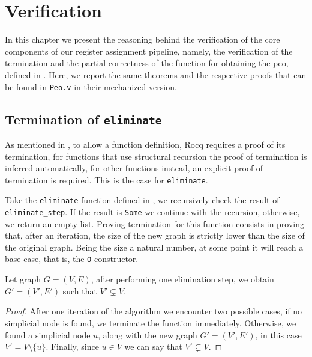 
\chapter{Verification}
\label{cha:verification}

In this chapter we present the reasoning behind the verification of the core components of our register assignment pipeline, namely, the verification of the termination and the partial correctness of the function for obtaining the \gls{peo}, defined in . Here, we report the same theorems and the respective proofs that can be found in \texttt{Peo.v} in their mechanized version.

\section{Termination of \texttt{eliminate}}

As mentioned in , to allow a function definition, Rocq requires a proof of its termination, for functions that use structural recursion the proof of termination is inferred automatically, for other functions instead, an explicit proof of termination is required. This is the case for \texttt{eliminate}.

Take the \texttt{eliminate} function defined in , we recursively check the result of \texttt{eliminate\_step}. If the result is \texttt{Some} we continue with the recursion, otherwise, we return an empty list. Proving termination for this function consists in proving that, after an iteration, the size of the new graph is strictly lower than the size of the original graph. Being the size a natural number, at some point it will reach a base case, that is, the \texttt{O} constructor.

\begin{theorem}\label{thm:term-elim}
    Let graph $G = (V, E)$, after performing one elimination step, we obtain $G' = (V', E')$ such that $V' \subsetneq V$. \Coqed
\end{theorem}
\begin{proof}
    After one iteration of the algorithm we encounter two possible cases, if no simplicial node is found, we terminate the function immediately. Otherwise, we found a simplicial node $u$, along with the new graph $G' = (V', E')$, in this case $V' = V \setminus \{ u \}$. Finally, since $u \in V$ we can say that $V' \subsetneq V$.
\end{proof}


